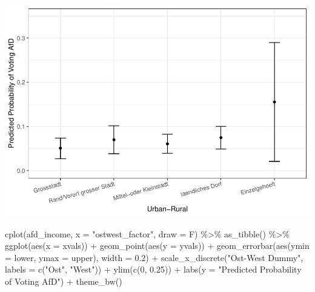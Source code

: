\documentclass[
]{article}
\newenvironment{Shaded}{\begin{snugshade}}{\end{snugshade}}
\newcommand{\AttributeTok}[1]{\textcolor[rgb]{0.77,0.63,0.00}{#1}}
\newcommand{\DecValTok}[1]{\textcolor[rgb]{0.00,0.00,0.81}{#1}}
\newcommand{\FloatTok}[1]{\textcolor[rgb]{0.00,0.00,0.81}{#1}}
\newcommand{\FunctionTok}[1]{\textcolor[rgb]{0.00,0.00,0.00}{#1}}
\newcommand{\NormalTok}[1]{#1}
\newcommand{\SpecialCharTok}[1]{\textcolor[rgb]{0.00,0.00,0.00}{#1}}
\newcommand{\StringTok}[1]{\textcolor[rgb]{0.31,0.60,0.02}{#1}}
\begin{document}
\includegraphics{AVCD_Final_Assignment-Edenhofer_files/figure-latex/afd-geography-1.pdf}

\begin{Shaded}
\begin{Highlighting}[]
\FunctionTok{cplot}\NormalTok{(afd\_income, }\AttributeTok{x =} \StringTok{"ostwest\_factor"}\NormalTok{, }\AttributeTok{draw =}\NormalTok{ F) }\SpecialCharTok{\%\textgreater{}\%}
  \FunctionTok{as\_tibble}\NormalTok{() }\SpecialCharTok{\%\textgreater{}\%}
  \FunctionTok{ggplot}\NormalTok{(}\FunctionTok{aes}\NormalTok{(}\AttributeTok{x =}\NormalTok{ xvals)) }\SpecialCharTok{+}
  \FunctionTok{geom\_point}\NormalTok{(}\FunctionTok{aes}\NormalTok{(}\AttributeTok{y =}\NormalTok{ yvals)) }\SpecialCharTok{+}
  \FunctionTok{geom\_errorbar}\NormalTok{(}\FunctionTok{aes}\NormalTok{(}\AttributeTok{ymin =}\NormalTok{ lower, }\AttributeTok{ymax =}\NormalTok{ upper), }\AttributeTok{width =} \FloatTok{0.2}\NormalTok{) }\SpecialCharTok{+}
  \FunctionTok{scale\_x\_discrete}\NormalTok{(}\StringTok{"Ost{-}West Dummy"}\NormalTok{, }\AttributeTok{labels =} \FunctionTok{c}\NormalTok{(}\StringTok{"Ost"}\NormalTok{, }\StringTok{"West"}\NormalTok{)) }\SpecialCharTok{+}
  \FunctionTok{ylim}\NormalTok{(}\FunctionTok{c}\NormalTok{(}\DecValTok{0}\NormalTok{, }\FloatTok{0.25}\NormalTok{)) }\SpecialCharTok{+}
  \FunctionTok{labs}\NormalTok{(}\AttributeTok{y =} \StringTok{"Predicted Probability of Voting AfD"}\NormalTok{) }\SpecialCharTok{+}
  \FunctionTok{theme\_bw}\NormalTok{()}
\end{Highlighting}
\end{Shaded}
\end{document}
